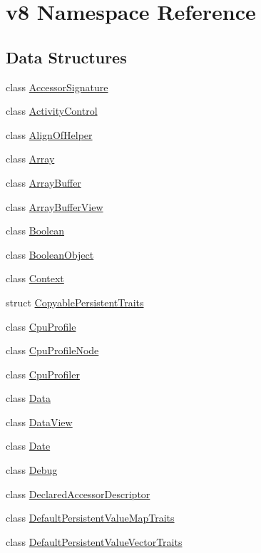 \hypertarget{namespacev8}{}\section{v8 Namespace Reference}
\label{namespacev8}
\subsection*{Data Structures}
\begin{DoxyCompactItemize}
\item 
class \hyperlink{classv8_1_1AccessorSignature}{Accessor\+Signature}
\item 
class \hyperlink{classv8_1_1ActivityControl}{Activity\+Control}
\item 
class \hyperlink{classv8_1_1AlignOfHelper}{Align\+Of\+Helper}
\item 
class \hyperlink{classv8_1_1Array}{Array}
\item 
class \hyperlink{classv8_1_1ArrayBuffer}{Array\+Buffer}
\item 
class \hyperlink{classv8_1_1ArrayBufferView}{Array\+Buffer\+View}
\item 
class \hyperlink{classv8_1_1Boolean}{Boolean}
\item 
class \hyperlink{classv8_1_1BooleanObject}{Boolean\+Object}
\item 
class \hyperlink{classv8_1_1Context}{Context}
\item 
struct \hyperlink{structv8_1_1CopyablePersistentTraits}{Copyable\+Persistent\+Traits}
\item 
class \hyperlink{classv8_1_1CpuProfile}{Cpu\+Profile}
\item 
class \hyperlink{classv8_1_1CpuProfileNode}{Cpu\+Profile\+Node}
\item 
class \hyperlink{classv8_1_1CpuProfiler}{Cpu\+Profiler}
\item 
class \hyperlink{classv8_1_1Data}{Data}
\item 
class \hyperlink{classv8_1_1DataView}{Data\+View}
\item 
class \hyperlink{classv8_1_1Date}{Date}
\item 
class \hyperlink{classv8_1_1Debug}{Debug}
\item 
class \hyperlink{classv8_1_1DeclaredAccessorDescriptor}{Declared\+Accessor\+Descriptor}
\item 
class \hyperlink{classv8_1_1DefaultPersistentValueMapTraits}{Default\+Persistent\+Value\+Map\+Traits}
\item 
class \hyperlink{classv8_1_1DefaultPersistentValueVectorTraits}{Default\+Persistent\+Value\+Vector\+Traits}

\end{DoxyCompactItemize}
